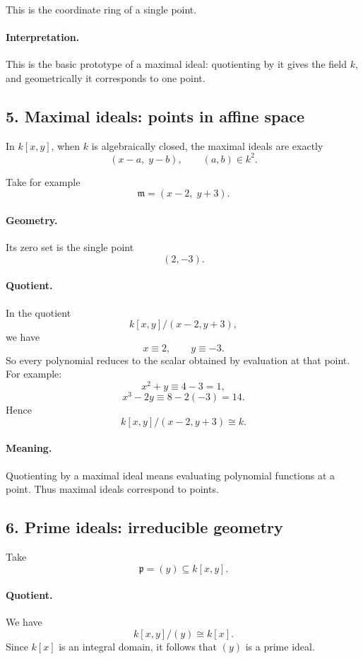 \documentclass[12pt,a4paper]{article}
\theoremstyle{plain}
\theoremstyle{definition}      %
\begin{document}
	This is the coordinate ring of a single point.
	
	\paragraph{Interpretation.}
	This is the basic prototype of a maximal ideal: quotienting by it gives the field \(k\), and geometrically it corresponds to one point.
	
	\subsection*{5. Maximal ideals: points in affine space}
	
	In \(k[x,y]\), when \(k\) is algebraically closed, the maximal ideals are exactly
	\[
	(x-a,\; y-b), \qquad (a,b)\in k^2.
	\]
	
	Take for example
	\[
	\mathfrak m=(x-2,\; y+3).
	\]
	
	\paragraph{Geometry.}
	Its zero set is the single point
	\[
	(2,-3).
	\]
	
	\paragraph{Quotient.}
	In the quotient
	\[
	k[x,y]/(x-2,y+3),
	\]
	we have
	\[
	x\equiv 2, \qquad y\equiv -3.
	\]
	So every polynomial reduces to the scalar obtained by evaluation at that point. For example:
	\[
	x^2+y \equiv 4-3=1,
	\]
	\[
	x^3-2y \equiv 8-2(-3)=14.
	\]
	Hence
	\[
	k[x,y]/(x-2,y+3)\cong k.
	\]
	
	\paragraph{Meaning.}
	Quotienting by a maximal ideal means evaluating polynomial functions at a point. Thus maximal ideals correspond to points.
	
	\subsection*{6. Prime ideals: irreducible geometry}
	
	Take
	\[
	\mathfrak p=(y)\subseteq k[x,y].
	\]
	
	\paragraph{Quotient.}
	We have
	\[
	k[x,y]/(y)\cong k[x].
	\]
	Since \(k[x]\) is an integral domain, it follows that \((y)\) is a prime ideal.
	
\end{document}
